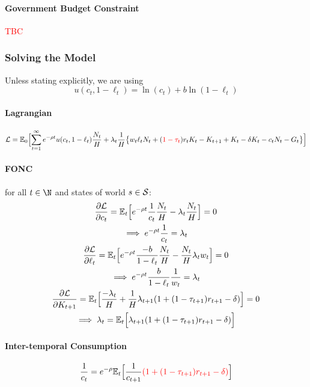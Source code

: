 \documentclass[11pt]{article}
\newcommand{\expat}[2]{\mathbb{E}_{#1}\Big[{#2}\Big]}
\begin{document}
			\paragraph{Government Budget Constraint} \textcolor{red}{TBC}
			
		\subsubsection{Solving the Model}
			\begin{assumption}
				Unless stating explicitly, we are using
				\begin{equation}
					u(c_t, 1-\ell_t) = \ln(c_t) + b \ln(1-\ell_t)
				\end{equation}
			\end{assumption}
			
			\paragraph{Lagrangian}
				\begin{equation}
					\mc{L} = \expat{0}{ \sum_{t=1}^\infty e^{-\rho t} u(c_t, 1 - \ell_t) \frac{N_t}{H} + \lambda_t \frac{1}{H}
						\big \{ w_t \ell_t N_t + (\textcolor{red}{1-\tau_t})r_t K_t - K_{t+1} + K_t - \delta K_t - c_t N_t - G_t \big \} }
				\end{equation}
			\paragraph{FONC} for all $t \in \N$ and states of world $s \in \mathcal{{S}}$:
				\begin{gather}
					\pd{\mc{L}}{c_t} = \expat{t}{
						e^{-\rho t} \frac{1}{c_t} \frac{N_t}{H} - \lambda_t \frac{N_t}{H}
					} = 0 \\
					\implies e^{-\rho t} \frac{1}{c_t} = \lambda_t \\
					\pd{\mc{L}}{\ell_t} = \expat{t}{
						e^{-\rho t} \frac{-b}{1 - \ell_t}\frac{N_t}{H} - \frac{N_t}{H} \lambda_t w_t
					} = 0 \\
					\implies e^{-\rho t} \frac{b}{1 - \ell_t} \frac{1}{w_t} = \lambda_t \\
					\pd{\mc{L}}{K_{t+1}} = \expat{t}{
						\frac{-\lambda_t}{H} + \frac{1}{H} \lambda_{t+1} (1 + (1-\tau_{t+1})r_{t+1} - \delta)
					} = 0 \\
					\implies \lambda_t = \expat{t}{\lambda_{t+1}(1 + (1-\tau_{t+1})r_{t+1} - \delta)}
				\end{gather}
			
			\paragraph{Inter-temporal Consumption}
				\begin{equation}
					\frac{1}{c_t} = e^{-\rho} \expat{t}{
						\frac{1}{c_{t+1}} \textcolor{red}{(1 + (1-\tau_{t+1})r_{t+1} - \delta)}
					}
				\end{equation}
			
\end{document}
